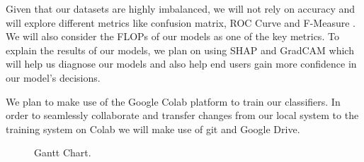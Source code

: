 \documentclass[10pt,twocolumn,letterpaper]{article}
\begin{document}
Given that our datasets are highly imbalanced, we will not rely on 
accuracy and will explore different metrics like confusion matrix, 
ROC Curve and F-Measure \cite{fmeasure}. We will also consider the FLOPs of our models 
as one of the key metrics. To explain the results of our models, 
we plan on using SHAP \cite{NIPS2017_8a20a862} and GradCAM \cite{jacobgilpytorchcam} which will help us diagnose our 
models and also help end users gain more confidence in our model's decisions.

We plan to make use of the Google Colab platform to train our classifiers. 
In order to seamlessly collaborate and transfer changes from our local 
system to the training system on Colab we will make use of git and Google Drive.
\clearpage
\begin{figure}[!h]
  \vspace{22.6cm}
  \hspace{2cm}
\caption{Gantt Chart.}
\end{figure}

\clearpage
{\small


}
\end{document}

